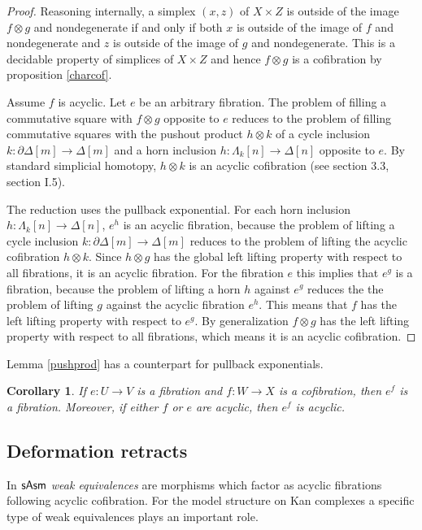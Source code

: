 \documentclass{amsart}
\theoremstyle{plain}
\newtheorem{corol}[theorem]{Corollary}
\theoremstyle{definition}
\begin{document}
\begin{proof} Reasoning internally, a simplex $(x,z)$ of $X\times Z$ is outside of the image $f\otimes g$ and nondegenerate if and only if both $x$ is outside of the image of $f$ and nondegenerate and $z$ is outside of the image of $g$ and nondegenerate. This is a decidable property of simplices of $X\times Z$ and hence $f\otimes g$ is a cofibration by proposition \ref{charcof}. 

Assume $f$ is acyclic. Let $e$ be an arbitrary fibration. The problem of filling a commutative square with $f\otimes g$ opposite to $e$ reduces to the problem of filling commutative squares with the pushout product $h\otimes k$ of a cycle inclusion $k:\partial\Delta[m]\to \Delta[m]$ and a horn inclusion $h:\Lambda_k
[n]\to\Delta[n]$ opposite to $e$. By standard simplicial homotopy, $h\otimes k$ is an acyclic cofibration (see \cite{Hovey99} section 3.3, \cite{GJSHT} section I.5). 

The reduction uses the pullback exponential. For each horn inclusion $h:\Lambda_k[n]\to \Delta[n]$, $e^h$ is an acyclic fibration, because the problem of lifting a cycle inclusion $k:\partial\Delta[m]\to \Delta[m]$ reduces to the problem of lifting the acyclic cofibration $h\otimes k$. Since $h\otimes g$ has the global left lifting property with respect to all fibrations, it is an acyclic fibration. For the fibration $e$ this implies that $e^g$ is a fibration, because the problem of lifting a horn $h$ against $e^g$ reduces the the problem of lifting $g$ against the acyclic fibration $e^h$. This means that $f$ has the left lifting property with respect to $e^g$. By generalization $f\otimes g$ has the left lifting property with respect to all fibrations, which means it is an acyclic cofibration.
\end{proof}

Lemma \ref{pushprod} has a counterpart for pullback exponentials.

\begin{corol} If $e:U\to V$ is a fibration and $f:W\to X$ is a cofibration, then $e^f$ is a fibration. Moreover, if either $f$ or $e$ are acyclic, then $e^f$ is acyclic. \label{pullexp}
\end{corol}

\subsection{Deformation retracts}
In $\mathsf{sAsm}$ \emph{weak equivalences} are morphisms which factor as acyclic fibrations following acyclic cofibration. For the model structure on Kan complexes a specific type of weak equivalences plays an important role.
\end{document}
